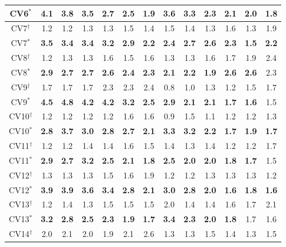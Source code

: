 \begin{table}[]
\begin{threeparttable}
\begin{tabular}{c|cccccc|cccccc}
CV6$^{*}$&\textbf{4.1} &\textbf{3.8} &\textbf{3.5} &\textbf{2.7} &\textbf{2.5} &\textbf{1.9} &\textbf{3.6} &\textbf{3.3} &\textbf{2.3} &\textbf{2.1} &\textbf{2.0} &\textbf{1.8} \\
\hline
CV7$^{\dag}$&1.2 &1.2 &1.3 &1.3 &1.5 &1.4 &1.5 &1.4 &1.3 &1.6 &1.3 &1.9 \\
CV7$^{*}$&\textbf{3.5} &\textbf{3.4} &\textbf{3.4} &\textbf{3.2} &\textbf{2.9} &\textbf{2.2} &\textbf{2.4} &\textbf{2.7} &\textbf{2.6} &\textbf{2.3} &\textbf{1.5} &\textbf{2.2} \\
\hline
CV8$^{\dag}$&1.2 &1.3 &1.3 &1.6 &1.5 &1.6 &1.3 &1.3 &1.6 &1.7 &1.9 &2.4 \\
CV8$^{*}$&\textbf{2.9} &\textbf{2.7} &\textbf{2.7} &\textbf{2.6} &\textbf{2.4} &\textbf{2.3} &\textbf{2.1} &\textbf{2.2} &\textbf{1.9} &\textbf{2.6} &\textbf{2.6} &2.3 \\
\hline
CV9$^{\dag}$&1.7 &1.7 &1.7 &2.3 &2.3 &2.4 &0.8 &1.0 &1.3 &1.2 &1.5 &1.7 \\
CV9$^{*}$&\textbf{4.5} &\textbf{4.8} &\textbf{4.2} &\textbf{4.2} &\textbf{3.2} &\textbf{2.5} &\textbf{2.9} &\textbf{2.1} &\textbf{2.1} &\textbf{1.7} &\textbf{1.6} &1.5 \\
\hline
CV10$^{\dag}$&1.2 &1.2 &1.2 &1.2 &1.6 &1.6 &0.9 &1.5 &1.1 &1.2 &1.2 &1.3 \\
CV10$^{*}$&\textbf{2.8} &\textbf{3.7} &\textbf{3.0} &\textbf{2.8} &\textbf{2.7} &\textbf{2.1} &\textbf{3.3} &\textbf{3.2} &\textbf{2.2} &\textbf{1.7} &\textbf{1.9} &\textbf{1.7} \\
\hline
CV11$^{\dag}$&1.2 &1.2 &1.4 &1.4 &1.6 &1.5 &1.4 &1.3 &1.4 &1.2 &1.2 &1.7 \\
CV11$^{*}$&\textbf{2.9} &\textbf{2.7} &\textbf{3.2} &\textbf{2.5} &\textbf{2.1} &\textbf{1.8} &\textbf{2.5} &\textbf{2.0} &\textbf{2.0} &\textbf{1.8} &\textbf{1.7} &1.5 \\
\hline
CV12$^{\dag}$&1.3 &1.3 &1.3 &1.5 &1.6 &1.9 &1.2 &1.2 &1.3 &1.3 &1.3 &1.2 \\
CV12$^{*}$&\textbf{3.9} &\textbf{3.9} &\textbf{3.6} &\textbf{3.4} &\textbf{2.8} &\textbf{2.1} &\textbf{3.0} &\textbf{2.8} &\textbf{2.0} &\textbf{1.6} &\textbf{1.8} &\textbf{1.6} \\
\hline
CV13$^{\dag}$&1.2 &1.4 &1.3 &1.5 &1.5 &1.5 &2.0 &1.4 &1.4 &1.6 &1.7 &2.1 \\
CV13$^{*}$&\textbf{3.2} &\textbf{2.8} &\textbf{2.5} &\textbf{2.3} &\textbf{1.9} &\textbf{1.7} &\textbf{3.4} &\textbf{2.3} &\textbf{2.0} &\textbf{1.8} &1.7 &1.6 \\
\hline
CV14$^{\dag}$&2.0 &2.1 &2.0 &1.9 &2.1 &2.6 &1.3 &1.3 &1.5 &1.4 &1.3 &1.5 \\

\end{tabular}
\end{threeparttable}
\end{table}
